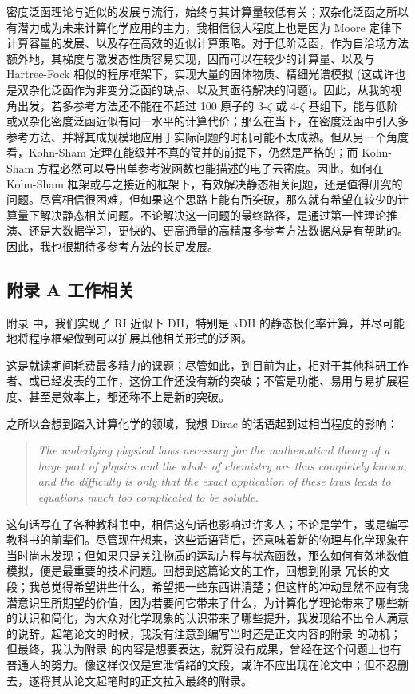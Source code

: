 密度泛函理论与近似的发展与流行，始终与其计算量较低有关；双杂化泛函之所以有潜力成为未来计算化学应用的主力，我相信很大程度上也是因为 Moore 定律下计算容量的发展、以及存在高效的近似计算策略\cite{Almloef-Almloef.CPL.1991, Weigend-Ahlrichs.CPL.1998, Hohenstein-Martinez.JCP.2012, Parrish-Sherrill.JCP.2012}。对于低阶泛函，作为自洽场方法额外地，其梯度与激发态性质容易实现，因而可以在较少的计算量、以及与 Hartree-Fock 相似的程序框架下，实现大量的固体物质、精细光谱模拟 (这或许也是双杂化泛函作为非变分泛函的缺点、以及其亟待解决的问题)。因此，从我的视角出发，若多参考方法还不能在不超过 100 原子的 3-$\zeta$ 或 4-$\zeta$ 基组下，能与低阶或双杂化密度泛函近似有同一水平的计算代价；那么在当下，在密度泛函中引入多参考方法、并将其成规模地应用于实际问题的时机可能不太成熟。但从另一个角度看，Kohn-Sham 定理在能级并不真的简并的前提下，仍然是严格的；而 Kohn-Sham 方程必然可以导出单参考波函数也能描述的电子云密度。因此，如何在 Kohn-Sham 框架或与之接近的框架下，有效解决静态相关问题，还是值得研究的问题。尽管相信很困难，但如果这个思路上能有所突破，那么就有希望在较少的计算量下解决静态相关问题。不论解决这一问题的最终路径，是通过第一性理论推演、还是大数据学习，更快的、更高通量的高精度多参考方法数据总是有帮助的。因此，我也很期待多参考方法的长足发展。

\subsection*{附录 A 工作相关}

附录  中，我们实现了 RI 近似下 DH，特别是 xDH 的静态极化率计算，并尽可能地将程序框架做到可以扩展其他相关形式的泛函。

这是就读期间耗费最多精力的课题；尽管如此，到目前为止，相对于其他科研工作者、或已经发表的工作，这份工作还没有新的突破；不管是功能、易用与易扩展程度、甚至是效率上，都还称不上是新的突破。

之所以会想到踏入计算化学的领域，我想 Dirac 的话语起到过相当程度的影响\cite{Dirac-Dirac.PRSLA.1929}：
\begin{quotation}
    \it
    The underlying physical laws necessary for the mathematical theory of a large part of physics and the whole of chemistry are thus completely known, and the difficulty is only that the exact application of these laws leads to equations much too complicated to be soluble.
\end{quotation}
这句话写在了各种教科书中，相信这句话也影响过许多人；不论是学生，或是编写教科书的前辈们。尽管现在想来，这些话语背后，还意味着新的物理与化学现象在当时尚未发现；但如果只是关注物质的运动方程与状态函数，那么如何有效地数值模拟，便是最重要的技术问题。回想到这篇论文的工作，回想到附录  冗长的文段；我总觉得希望讲些什么，希望把一些东西讲清楚；但这样的冲动显然不应有我潜意识里所期望的价值，因为若要问它带来了什么，为计算化学理论带来了哪些新的认识和简化，为大众对化学现象的认识带来了哪些提升，我发现给不出令人满意的说辞。起笔论文的时候，我没有注意到编写当时还是正文内容的附录  的动机；但最终，我认为附录  的内容是想要表达，就算没有成果，曾经在这个问题上也有普通人的努力。像这样仅仅是宣泄情绪的文段，或许不应出现在论文中；但不忍删去，遂将其从论文起笔时的正文拉入最终的附录。

